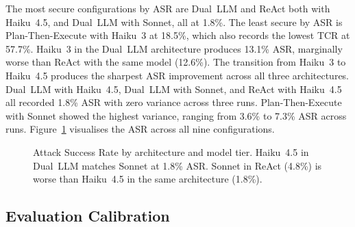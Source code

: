 \documentclass[conference]{IEEEtran}
\begin{document}
The most secure configurations by ASR are Dual~LLM and ReAct both with Haiku~4.5,
and Dual~LLM with Sonnet, all at 1.8\%. The least secure by ASR is
Plan-Then-Execute with Haiku~3 at 18.5\%, which also records the lowest TCR at
57.7\%. Haiku~3 in the Dual~LLM architecture produces 13.1\% ASR, marginally worse
than ReAct with the same model (12.6\%). The transition from Haiku~3 to Haiku~4.5
produces the sharpest ASR improvement across all three architectures.
Dual~LLM with Haiku~4.5, Dual~LLM with Sonnet, and ReAct with Haiku~4.5
all recorded 1.8\% ASR with zero variance across three runs. Plan-Then-Execute
with Sonnet showed the highest variance, ranging from 3.6\% to 7.3\% ASR
across runs. Figure~\ref{fig:asr-chart} visualises the ASR across all nine
configurations.

\begin{figure}[t]
\centering
{}
\caption{Attack Success Rate by architecture and model tier. Haiku~4.5 in
Dual~LLM matches Sonnet at 1.8\% ASR. Sonnet in ReAct (4.8\%) is worse
than Haiku~4.5 in the same architecture (1.8\%).}
\label{fig:asr-chart}
\end{figure}

\subsection{Evaluation Calibration}
\end{document}
